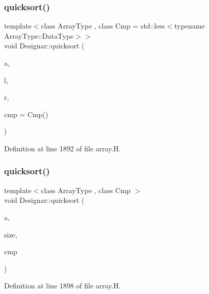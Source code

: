 \subsubsection{\texorpdfstring{quicksort()}{quicksort()}\hspace{0.1cm}{\footnotesize\ttfamily [10/14]}}
{\footnotesize\ttfamily template$<$class Array\+Type , class Cmp  = std\+::less$<$typename Array\+Type\+::\+Data\+Type$>$$>$ \\
void Designar\+::quicksort (\begin{DoxyParamCaption}\item[{Array\+Type \&}]{a,  }\item[{\hyperlink{namespace_designar_a9d113d66a39e82b73727c72cd3a52f73}{lint\+\_\+t}}]{l,  }\item[{\hyperlink{namespace_designar_a9d113d66a39e82b73727c72cd3a52f73}{lint\+\_\+t}}]{r,  }\item[{Cmp \&\&}]{cmp = {\ttfamily Cmp()} }\end{DoxyParamCaption})\hspace{0.3cm}{\ttfamily [inline]}}



Definition at line 1892 of file array.\+H.

\mbox{\label{namespace_designar_a4887d9486cdfcd7e021047915ae26651}} 
\subsubsection{\texorpdfstring{quicksort()}{quicksort()}\hspace{0.1cm}{\footnotesize\ttfamily [11/14]}}
{\footnotesize\ttfamily template$<$class Array\+Type , class Cmp $>$ \\
void Designar\+::quicksort (\begin{DoxyParamCaption}\item[{Array\+Type \&}]{a,  }\item[{\hyperlink{namespace_designar_a9d113d66a39e82b73727c72cd3a52f73}{lint\+\_\+t}}]{size,  }\item[{Cmp \&}]{cmp }\end{DoxyParamCaption})\hspace{0.3cm}{\ttfamily [inline]}}



Definition at line 1898 of file array.\+H.

